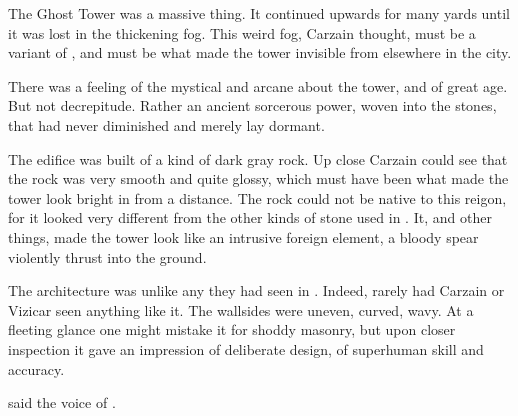 



\begin{comment}
  \section{Carzain finds Ghost Tower}
\end{comment}
The Ghost Tower was a massive thing. 
It continued upwards for many yards until it was lost in the thickening fog.
This weird fog, Carzain thought, must be a variant of \wildfog, and must be what made the tower invisible from elsewhere in the city. 

There was a feeling of the mystical and arcane about the tower, and of great age. 
But not decrepitude. 
Rather an ancient sorcerous power, woven into the stones, that had never diminished and merely lay dormant. 

The edifice was built of a kind of dark gray rock. 
Up close Carzain could see that the rock was very smooth and quite glossy, which must have been what made the tower look bright in \colour from a distance. 
The rock could not be native to this reigon, for it looked very different from the other kinds of stone used in \Forclin. 
It, and other things, made the tower look like an intrusive foreign element, a bloody spear violently thrust into the ground. 

The architecture was unlike any they had seen in \Forclin.
Indeed, rarely had Carzain or Vizicar seen anything like it. 
The wallsides were uneven, curved, wavy. 
At a fleeting glance one might mistake it for shoddy masonry, but upon closer inspection it gave an impression of deliberate design, of superhuman skill and accuracy. 

 said the voice of \VizicarDurasRespina.

